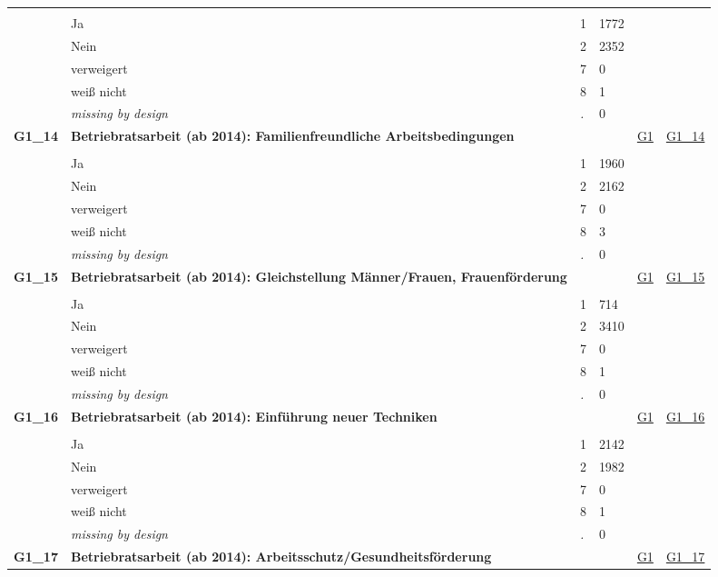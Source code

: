 \begin{longtable}{| L{2.45cm} | L{6cm} | C{1.5cm} | R{1cm} | C{2.25cm} | C{2.25cm} |}
   &  &  &  &  &  \\ 
   & Ja & 1 & 1772 &  &  \\ 
   & Nein & 2 & 2352 &  &  \\ 
   & verweigert & 7 & 0 &  &  \\ 
   & weiß nicht & 8 & 1 &  &  \\ 
   & \textit{missing by design} & \textit{.} & 0 &  &  \\ 
   \midrule
\textbf{G1\_14}\label{var:G1:14} & \textbf{Betriebratsarbeit (ab 2014): Familienfreundliche Arbeitsbedingungen} &  &  & \hyperref[G1]{G1} & \hyperref[var:suf:G1:14]{G1\_14} \\ 
   &  &  &  &  &  \\ 
   & Ja & 1 & 1960 &  &  \\ 
   & Nein & 2 & 2162 &  &  \\ 
   & verweigert & 7 & 0 &  &  \\ 
   & weiß nicht & 8 & 3 &  &  \\ 
   & \textit{missing by design} & \textit{.} & 0 &  &  \\ 
   \midrule
\textbf{G1\_15}\label{var:G1:15} & \textbf{Betriebratsarbeit (ab 2014): Gleichstellung Männer/Frauen, Frauenförderung} &  &  & \hyperref[G1]{G1} & \hyperref[var:suf:G1:15]{G1\_15} \\ 
   &  &  &  &  &  \\ 
   & Ja & 1 & 714 &  &  \\ 
   & Nein & 2 & 3410 &  &  \\ 
   & verweigert & 7 & 0 &  &  \\ 
   & weiß nicht & 8 & 1 &  &  \\ 
   & \textit{missing by design} & \textit{.} & 0 &  &  \\ 
   \midrule
\textbf{G1\_16}\label{var:G1:16} & \textbf{Betriebratsarbeit (ab 2014): Einführung neuer Techniken} &  &  & \hyperref[G1]{G1} & \hyperref[var:suf:G1:16]{G1\_16} \\ 
   &  &  &  &  &  \\ 
   & Ja & 1 & 2142 &  &  \\ 
   & Nein & 2 & 1982 &  &  \\ 
   & verweigert & 7 & 0 &  &  \\ 
   & weiß nicht & 8 & 1 &  &  \\ 
   & \textit{missing by design} & \textit{.} & 0 &  &  \\ 
   \midrule
\textbf{G1\_17}\label{var:G1:17} & \textbf{Betriebratsarbeit (ab 2014): Arbeitsschutz/Gesundheitsförderung} &  &  & \hyperref[G1]{G1} & \hyperref[var:suf:G1:17]{G1\_17} \\ 

\end{longtable}
